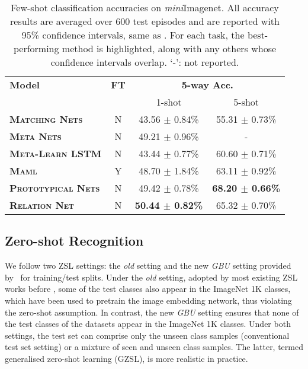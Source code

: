\documentclass[10pt,twocolumn,letterpaper]{article}
\begin{document}
\setlength{\tabcolsep}{4.8pt}
\begin{table}[t]
\centering
\footnotesize
\begin{tabular}{@{} lccc @{}}
\toprule
\multirow{2}{*}{\bf Model} & \multirow{2}{*}{\bf FT} &\multicolumn{2}{c}{\multirow{2}{*}{\bf 5-way Acc.}}\\
& \multicolumn{2}{c}{}  \\
& & 1-shot & 5-shot \\
\midrule 

\textbf{\textsc{Matching} \textsc{Nets}} \cite{vinyals2016matching}& N &43.56 $\pm$ 0.84\% &55.31 $\pm$ 0.73\%  \\ 
\textbf{\textsc{Meta} \textsc{Nets}} \cite{munkhdalai2017meta}& N &49.21 $\pm$ 0.96\% & - \\ 
\textbf{\textsc{Meta}-\textsc{Learn} \textsc{LSTM}} \cite{ravi2016optimization}& N &43.44 $\pm$ 0.77\% & 60.60 $\pm$ 0.71\% \\ 
\textbf{\textsc{Maml}} \cite{finn2017model}& Y& 48.70 $\pm$ 1.84\% & 63.11 $\pm$ 0.92\% \\ 
\textbf{\textsc{Prototypical} \textsc{Nets}} \cite{snell2017prototypical}&N  &49.42 $ \pm $ 0.78\% &\textbf{68.20 $\pm$ 0.66\%}  \\ 
\midrule
\textbf{\textsc{Relation} \textsc{Net}}&N& \textbf{50.44 $\pm$ 0.82\%} &65.32 $\pm$ 0.70\% \\ 
\bottomrule
\end{tabular}\caption{\small
Few-shot classification accuracies on \textit{mini}Imagenet. All accuracy results are averaged over 600 test episodes and are reported with 95\% confidence intervals, same as \cite{snell2017prototypical}. For each task, the best-performing method is highlighted, along with any others whose confidence intervals overlap. `-': not reported.
}
\label{tab:mini}
\end{table}
 











\subsection{Zero-shot Recognition}
We follow two ZSL settings: the \emph{old} setting and the new \emph{GBU} setting provided by~\cite{xian2017zero} for training/test splits. 
Under the \emph{old} setting, adopted by most existing ZSL works before \cite{xian2017zero}, some of the test classes also appear in
the ImageNet 1K classes, which have been used to pretrain the image embedding 
network, thus violating the zero-shot assumption.
In contrast, the new \emph{GBU} setting ensures that none of the test classes of the datasets appear in
the ImageNet 1K classes. Under both settings, the test set can comprise only the unseen class samples (conventional test set setting) or a mixture of seen and unseen class samples. The latter, termed   generalised zero-shot learning (GZSL), is more realistic in practice.  
\end{document}
